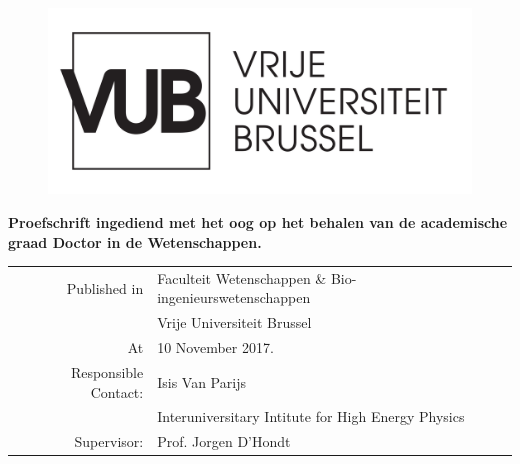 
\begin{center}
	\vspace*{5mm}
     
    \begin{figure}[ht]
    	\centering
    	\includegraphics[width=0.5\linewidth]{"VUB MONO positief/VUB MONO POSITIEF OUTLINE"}
    	\label{fig:vub-mono-positief-outline}
    \end{figure}
    
	\huge \textbf{\Title}

	\vspace{10mm}

	\Large \Author
	
	\vspace{15mm}
	\large \textbf{Proefschrift ingediend met het oog op het behalen van de academische graad Doctor in de Wetenschappen.}

	\vspace{25mm}
	\small
	\begin{tabular}{rl}
     Published in & Faculteit Wetenschappen \& Bio-ingenieurswetenschappen \\[2mm]
                  &\large Vrije Universiteit Brussel \\[2mm]
               At & \large 10 November 2017.\\[15mm]
   Responsible Contact: & \large Isis Van Parijs \\[1mm]
                  & Interuniversitary Intitute for High Energy Physics\\
                  Supervisor: & Prof. Jorgen D'Hondt
	\end{tabular}


\end{center}

\thispagestyle{empty}
\newpage
\null

